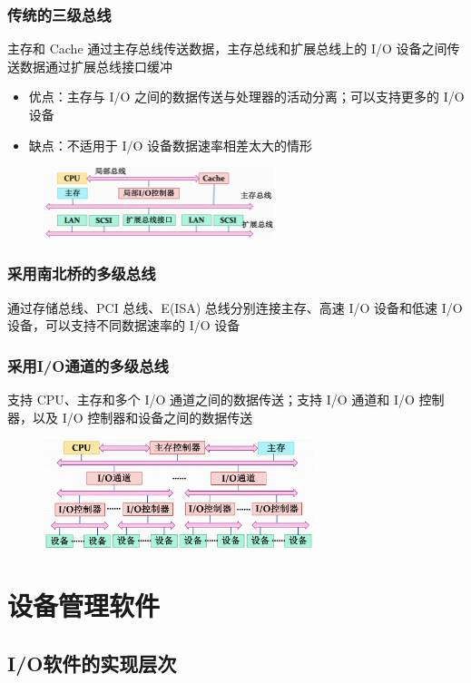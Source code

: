 \documentclass[cs4size,a4paper,10pt]{ctexart}
\begin{document}
	\subsubsection{传统的三级总线}
	主存和 Cache 通过主存总线传送数据，主存总线和扩展总线上的 I/O 设备之间传送数据通过扩展总线接口缓冲
	\begin{itemize}
		\item 优点：主存与 I/O 之间的数据传送与处理器的活动分离；可以支持更多的 I/O 设备
		\item 缺点：不适用于 I/O 设备数据速率相差太大的情形
	\end{itemize}
	\begin{figure}[H]
		\centering
		\includegraphics[width=0.6\textwidth]{img/4.1.3.2}
	\end{figure}

	\subsubsection{采用南北桥的多级总线}
	通过存储总线、PCI 总线、E(ISA) 总线分别连接主存、高速 I/O 设备和低速 I/O 设备，可以支持不同数据速率的 I/O 设备

	\subsubsection{采用I/O通道的多级总线}
	支持 CPU、主存和多个 I/O 通道之间的数据传送；支持 I/O 通道和 I/O 控制器，以及 I/O 控制器和设备之间的数据传送
	\begin{figure}[H]
		\centering
		\includegraphics[width=0.7\textwidth]{img/4.1.3.4}
	\end{figure}


	\section{设备管理软件}
	\subsection{I/O软件的实现层次}
\end{document}
